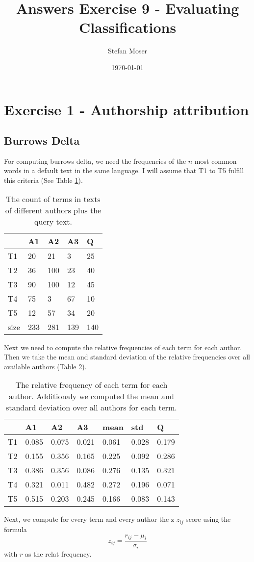 \documentclass[11pt]{article}
\title{\textbf{Answers Exercise 9 - Evaluating Classifications}}
\author{Stefan Moser}
\date{\today}
\begin{document}
\maketitle

\section*{Exercise 1 - Authorship attribution}
\subsection{Burrows Delta}
For computing burrows delta, we need the 
frequencies of the $n$ most common words in a default text in the same language. I will
assume that T1 to T5 fulfill this criteria (See Table \ref{table:count}). 
\begin{table}[h]
\center
\begin{tabular}{|l|l|l|l|l|}
\hline
	 & A1 & A2 & A3 & Q\\
\hline
	T1 & 20 & 21 & 3 & 25\\
\hline
	T2 & 36 & 100 & 23 & 40\\
\hline
	T3 & 90 & 100 & 12 & 45\\
\hline
	T4 & 75 & 3 & 67 & 10\\
\hline
	T5 & 12 & 57 & 34 & 20\\
\hline
	size & 233 & 281 & 139 & 140\\
\hline
\end{tabular}
\caption{The count of terms in texts of different authors plus the query text.}
\label{table:count}
\end{table}
Next we need to compute the relative frequencies of each term for each author. Then we take the mean and standard deviation of the relative frequencies over
all available authors (Table \ref{table:rel_freq}).
\begin{table}[h]
\center
\begin{tabular}{|l|l|l|l|l|l||l|}
\hline
	 & A1 & A2 & A3 & mean & std & Q\\
\hline
	T1 & 0.085 & 0.075 & 0.021 & 0.061 & 0.028 & 0.179\\
\hline
	T2 & 0.155 & 0.356 & 0.165 & 0.225 & 0.092 & 0.286 \\
\hline
	T3 & 0.386 & 0.356 & 0.086 & 0.276 & 0.135 & 0.321 \\
\hline
	T4 & 0.321 & 0.011 & 0.482 & 0.272 & 0.196 & 0.071 \\
\hline
	T5 & 0.515 & 0.203 & 0.245 & 0.166 & 0.083 & 0.143 \\
\hline
\end{tabular}
\caption{The relative frequency of each term
for each author. Additionaly we computed
the mean and standard deviation over all
authors for each term.}
\label{table:rel_freq}
\end{table}
Next, we compute for every term and every author the z $z_{ij}$ score using the formula
\begin{equation}
	z_{ij} = \frac{r_{ij} - \mu_i}{\sigma_i}
\end{equation}
with $r$ as the relat frequency. 
\end{document}

